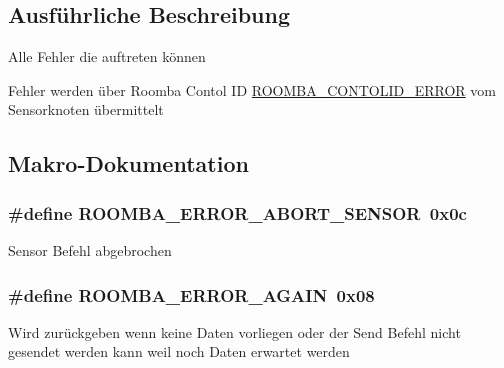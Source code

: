 \subsection{Ausführliche Beschreibung}
Alle Fehler die auftreten können

Fehler werden über Roomba Contol I\-D \hyperlink{group__roomba__contol_ga73471faf57dbef86411795f303eb9914}{R\-O\-O\-M\-B\-A\-\_\-\-C\-O\-N\-T\-O\-L\-I\-D\-\_\-\-E\-R\-R\-O\-R} vom Sensorknoten übermittelt 

\subsection{Makro-\/\-Dokumentation}
\hypertarget{group__roomba__error_gaacd25ee9912b9e5c47373ac43eba1830}{
\subsubsection[{R\-O\-O\-M\-B\-A\-\_\-\-E\-R\-R\-O\-R\-\_\-\-A\-B\-O\-R\-T\-\_\-\-S\-E\-N\-S\-O\-R}]{\setlength{\rightskip}{0pt plus 5cm}\#define R\-O\-O\-M\-B\-A\-\_\-\-E\-R\-R\-O\-R\-\_\-\-A\-B\-O\-R\-T\-\_\-\-S\-E\-N\-S\-O\-R~0x0c}}\label{group__roomba__error_gaacd25ee9912b9e5c47373ac43eba1830}
Sensor Befehl abgebrochen \hypertarget{group__roomba__error_gad35f7cffbb363514d9453cea041593e4}{
\subsubsection[{R\-O\-O\-M\-B\-A\-\_\-\-E\-R\-R\-O\-R\-\_\-\-A\-G\-A\-I\-N}]{\setlength{\rightskip}{0pt plus 5cm}\#define R\-O\-O\-M\-B\-A\-\_\-\-E\-R\-R\-O\-R\-\_\-\-A\-G\-A\-I\-N~0x08}}\label{group__roomba__error_gad35f7cffbb363514d9453cea041593e4}
Wird zurückgeben wenn keine Daten vorliegen oder der Send Befehl nicht gesendet werden kann weil noch Daten erwartet werden

